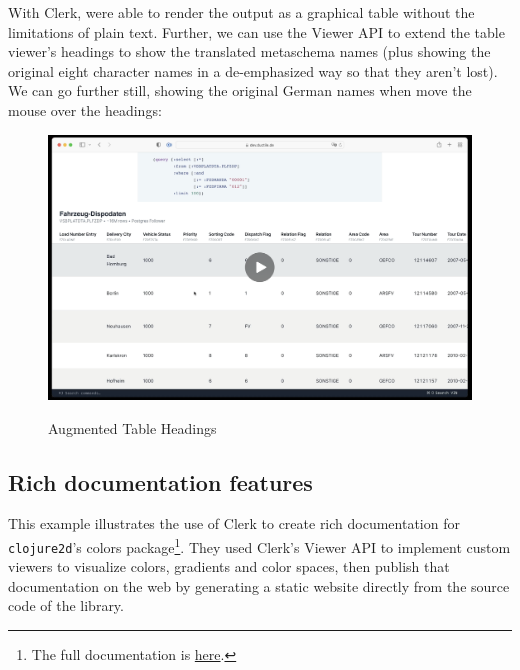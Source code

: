\documentclass[sigconf,screen]{acmart}
\newcommand{\passthrough}[1]{#1}
\begin{document}
With Clerk, were able to render the output as a graphical table without the limitations of plain text. Further, we can use the Viewer API to extend the table viewer's headings to show the translated metaschema names (plus showing the original eight character names in a de-emphasized way so that they aren't lost). We can go further still, showing the original German names when move the mouse over the headings:

\begin{figure}
\hypertarget{augmented-table-headings}{%
\centering
\href{https://cdn.nextjournal.com/data/QmVZsXxsX2wcYYc758yHkZjijW2HdZhaGcfQaHpAkZeqWk?content-type=video/mp4}{\includegraphics{images/augmented-table-headings.png}}
\caption{Augmented Table Headings}\label{augmented-table-headings}
}
\end{figure}

\hypertarget{rich-documentation-features}{%
\subsection{Rich documentation features}\label{rich-documentation-features}}

This example illustrates the use of Clerk to create rich documentation for \passthrough{\lstinline!clojure2d!}'s colors package\footnote{The full documentation is \href{https://clojure2d.github.io/clojure2d/docs/notebooks/notebooks/color.html}{here}.}. They used Clerk's Viewer API to implement custom viewers to visualize colors, gradients and color spaces, then publish that documentation on the web by generating a static website directly from the source code of the library.
\end{document}

